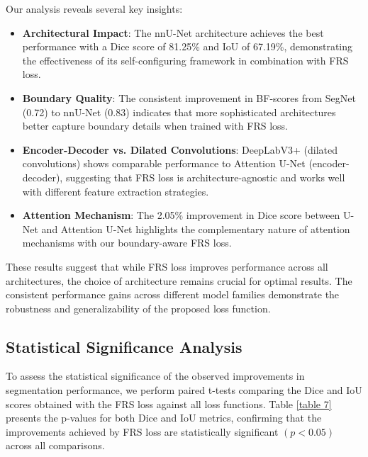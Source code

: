 \documentclass[review]{elsarticle}
\begin{document}
Our analysis reveals several key insights:
\begin{itemize}
	\item \textbf{Architectural Impact}: The nnU-Net architecture achieves the best performance with a Dice score of 81.25\% and IoU of 67.19\%, demonstrating the effectiveness of its self-configuring framework in combination with FRS loss.
	\item \textbf{Boundary Quality}: The consistent improvement in BF-scores from SegNet (0.72) to nnU-Net (0.83) indicates that more sophisticated architectures better capture boundary details when trained with FRS loss.
	\item \textbf{Encoder-Decoder vs. Dilated Convolutions}: DeepLabV3+ (dilated convolutions) shows comparable performance to Attention U-Net (encoder-decoder), suggesting that FRS loss is architecture-agnostic and works well with different feature extraction strategies.
	\item \textbf{Attention Mechanism}: The 2.05\% improvement in Dice score between U-Net and Attention U-Net highlights the complementary nature of attention mechanisms with our boundary-aware FRS loss.
\end{itemize}

These results suggest that while FRS loss improves performance across all architectures, the choice of architecture remains crucial for optimal results. The consistent performance gains across different model families demonstrate the robustness and generalizability of the proposed loss function.

\subsection{Statistical Significance Analysis}
To assess the statistical significance of the observed improvements in segmentation performance, we perform paired t-tests comparing the Dice and IoU scores obtained with the FRS loss against all loss functions. Table \ref{table 7} presents the p-values for both Dice and IoU metrics, confirming that the improvements achieved by FRS loss are statistically significant \((p < 0.05)\) across all comparisons.
\end{document}
